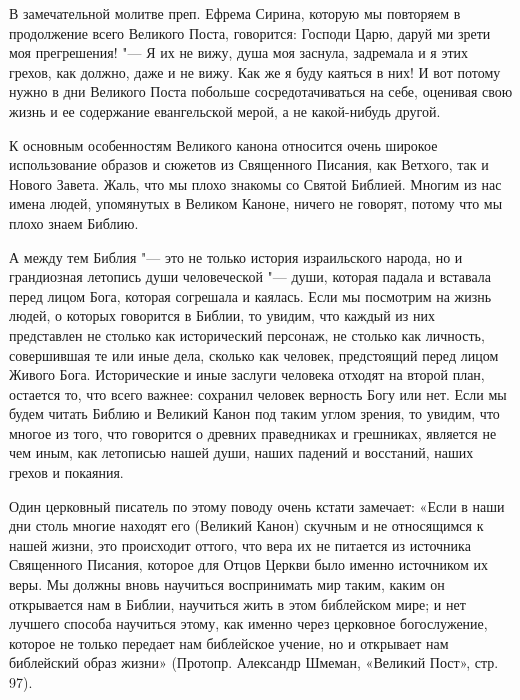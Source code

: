 \begin{mymulticols}
В замечательной молитве преп. Ефрема Сирина, которую мы повторяем в продолжение всего Великого Поста, говорится: Господи Царю, даруй ми зрети моя прегрешения! "--- Я их не вижу, душа моя заснула, задремала и я этих грехов, как должно, даже и не вижу. Как же я буду каяться в них! И вот потому нужно в дни Великого Поста побольше сосредотачиваться на себе, оценивая свою жизнь и ее содержание евангельской мерой, а не какой-нибудь другой.

К основным особенностям Великого канона относится очень широкое использование образов и сюжетов из Священного Писания, как Ветхого, так и Нового Завета. Жаль, что мы плохо знакомы со Святой Библией. Многим из нас имена людей, упомянутых в Великом Каноне, ничего не говорят, потому что мы плохо знаем Библию.

А между тем Библия "--- это не только история израильского народа, но и грандиозная летопись души человеческой "--- души, которая падала и вставала перед лицом Бога, которая согрешала и каялась. Если мы посмотрим на жизнь людей, о которых говорится в Библии, то увидим, что каждый из них представлен не столько как исторический персонаж, не столько как личность, совершившая те или иные дела, сколько как человек, предстоящий перед лицом Живого Бога. Исторические и иные заслуги человека отходят на второй план, остается то, что всего важнее: сохранил человек верность Богу или нет. Если мы будем читать Библию и Великий Канон под таким углом зрения, то увидим, что многое из того, что говорится о древних праведниках и грешниках, является не чем иным, как летописью нашей души, наших падений и восстаний, наших грехов и покаяния.

Один церковный писатель по этому поводу очень кстати замечает: «Если в наши дни столь многие находят его (Великий Канон) скучным и не относящимся к нашей жизни, это происходит оттого, что вера их не питается из источника Священного Писания, которое для Отцов Церкви было именно источником их веры. Мы должны вновь научиться воспринимать мир таким, каким он открывается нам в Библии, научиться жить в этом библейском мире; и нет лучшего способа научиться этому, как именно через церковное богослужение, которое не только передает нам библейское учение, но и открывает нам библейский образ жизни» (Протопр. Александр Шмеман, «Великий Пост», стр. 97).


\end{mymulticols}
